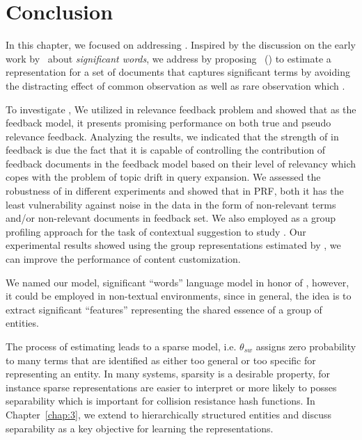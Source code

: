



\section{Conclusion} 
In this chapter, we focused on addressing \textbf{}.
Inspired by the discussion on the early work by~\citet{Luhn:1958} about \emph{significant words}, we address \textbf{} by proposing \emph{\swlms}\ (\acswlm) to estimate a representation for a set of documents that captures significant terms by avoiding the distracting effect of common observation as well as rare observation which .

To investigate \textbf{}, We utilized \acswlm in relevance feedback problem and showed that as the feedback model, it presents promising performance on both true and pseudo relevance feedback. Analyzing the results, we indicated that the strength of \acswlm in feedback is due the fact that it is capable of controlling the contribution of feedback documents in the feedback model based on their level of relevancy which copes with the problem of topic drift in query expansion. We assessed the robustness of \acswlm in different experiments and showed that in PRF, both it has the least vulnerability against noise in the data in the form of non-relevant terms and/or non-relevant documents in feedback set.
%
We also employed \acswlm as a group profiling approach for the task of contextual suggestion to study \textbf{}. Our experimental results showed using the group representations estimated by \acswlm, we can improve the performance of content customization. 

We named our model, significant ``words'' language model in honor of \citeauthor{Luhn:1958}, however, it could be employed in non-textual environments, since in general, the idea is to extract significant ``features'' representing the shared essence of a group of entities.

The process of estimating \acswlm leads to a sparse model, i.e. $\theta_{sw}$ assigns zero probability to many terms that are identified as either too general or too specific for representing an entity. 
In many systems, sparsity is a desirable property, for instance sparse representations are easier to interpret or more likely to posses separability which is important for collision resistance hash functions. 
In Chapter~\ref{chap:3}, we extend \acswlm to hierarchically structured entities and discuss separability as a key objective for learning the representations.